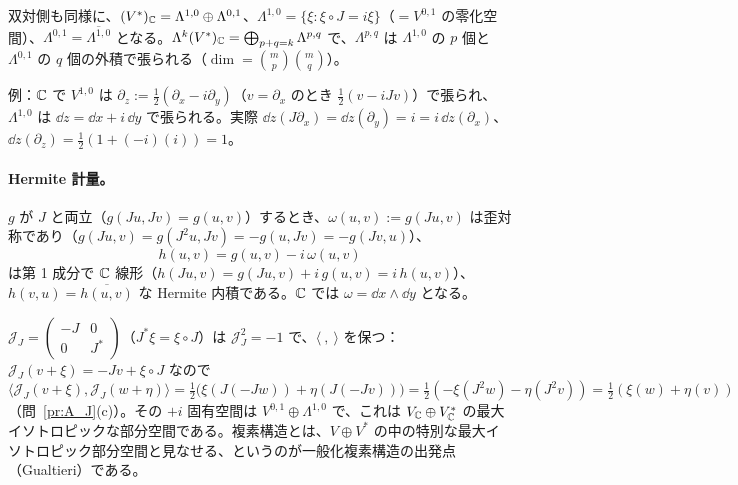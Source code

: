 双対側も同様に、$(V^*)_{\mathbb C}=\Lambda^{1,0}\oplus\Lambda^{0,1}$、$\Lambda^{1,0}=\{\xi:\xi\circ J=i\xi\}$（$=V^{0,1}$ の零化空間）、$\Lambda^{0,1}=\overline{\Lambda^{1,0}}$ となる。$\Lambda^k(V^*)_{\mathbb C}=\bigoplus_{p+q=k}\Lambda^{p,q}$ で、$\Lambda^{p,q}$ は $\Lambda^{1,0}$ の $p$ 個と $\Lambda^{0,1}$ の $q$ 個の外積で張られる（$\dim=\binom mp\binom mq$）。

例：$\mathbb C$ で $V^{1,0}$ は $\partial_z:=\frac12(\partial_x-i\partial_y)$（$v=\partial_x$ のとき $\frac12(v-iJv)$）で張られ、$\Lambda^{1,0}$ は $\dd z=\dd x+i\,\dd y$ で張られる。実際 $\dd z(J\partial_x)=\dd z(\partial_y)=i=i\,\dd z(\partial_x)$、$\dd z(\partial_z)=\frac12(1+(-i)(i))=1$。

\paragraph{Hermite 計量。}$g$ が $J$ と両立（$g(Ju,Jv)=g(u,v)$）するとき、$\omega(u,v):=g(Ju,v)$ は歪対称であり（$g(Ju,v)=g(J^2u,Jv)=-g(u,Jv)=-g(Jv,u)$）、
\[
h(u,v)=g(u,v)-i\,\omega(u,v)
\]
は第 1 成分で $\mathbb C$ 線形（$h(Ju,v)=g(Ju,v)+i\,g(u,v)=i\,h(u,v)$）、$h(v,u)=\overline{h(u,v)}$ な Hermite 内積である。$\mathbb C$ では $\omega=\dd x\wedge\dd y$ となる。

\begin{rem}
$\mathcal J_J=\begin{pmatrix}-J&0\\0&J^*\end{pmatrix}$（$J^*\xi=\xi\circ J$）は $\mathcal J_J^2=-1$ で、$\langle\ ,\ \rangle$ を保つ：$\mathcal J_J(v+\xi)=-Jv+\xi\circ J$ なので $\langle\mathcal J_J(v+\xi),\mathcal J_J(w+\eta)\rangle=\frac12\bigl(\xi(J(-Jw))+\eta(J(-Jv))\bigr)=\frac12(-\xi(J^2w)-\eta(J^2v))=\frac12(\xi(w)+\eta(v))$（問~\ref{pr:A_J}(c)）。その $+i$ 固有空間は $V^{0,1}\oplus\Lambda^{1,0}$ で、これは $V_{\mathbb C}\oplus V_{\mathbb C}^*$ の最大イソトロピックな部分空間である。複素構造とは、$V\oplus V^*$ の中の特別な最大イソトロピック部分空間と見なせる、というのが一般化複素構造の出発点（Gualtieri\tQ）である。
\end{rem}

